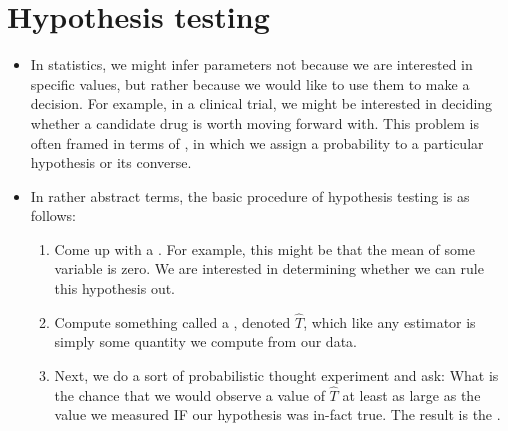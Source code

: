\section{Hypothesis testing}
\begin{itemize}
\item In statistics, we might infer parameters not because we are interested in specific values, but rather because we would like to use them to make a decision. For example, in a clinical trial, we might be interested in deciding whether a candidate drug is worth moving forward with. This problem is often framed in terms of , in which we assign a probability to a particular hypothesis or its converse. 
\item In rather abstract terms, the basic procedure of hypothesis testing is as follows:
\begin{enumerate}
\item Come up with a . For example, this might be that the mean of some variable is zero. We are interested in determining whether we can rule this hypothesis out. 
\item Compute something called a , denoted $\hat{T}$, which like any estimator is simply some quantity we compute from our data. 
\item Next, we do a sort of probabilistic thought experiment and ask: What is the chance that we would observe a value of $\hat{T}$ at least as large as the value we measured  IF our hypothesis was in-fact true.  The result is the . 
\end{enumerate}


\end{itemize}
